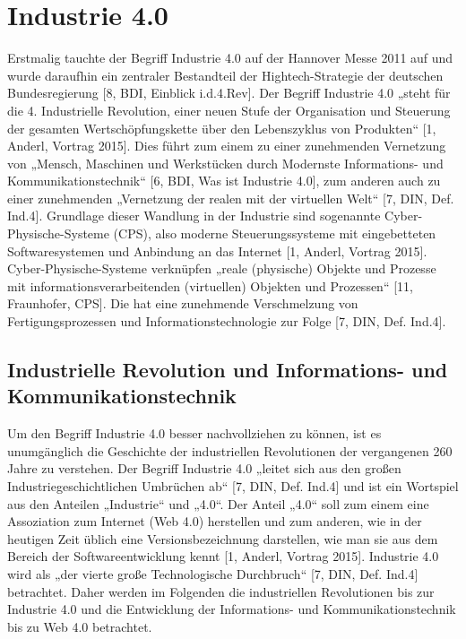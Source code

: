 \section{Industrie 4.0}\label{sec:Industrie4.0}
Erstmalig tauchte der Begriff Industrie 4.0 auf der Hannover Messe 2011 auf und wurde daraufhin ein zentraler Bestandteil der Hightech-Strategie der deutschen Bundesregierung [8, BDI, Einblick i.d.4.Rev].
\newline
Der Begriff Industrie 4.0 „steht für die 4. Industrielle Revolution, einer neuen Stufe der Organisation und Steuerung der gesamten Wertschöpfungskette über den Lebenszyklus von Produkten“ [1, Anderl, Vortrag 2015]. Dies führt zum einem zu einer zunehmenden Vernetzung von „Mensch, Maschinen und Werkstücken durch Modernste Informations- und Kommunikationstechnik“ [6, BDI, Was ist Industrie 4.0], zum anderen auch zu einer zunehmenden „Vernetzung der realen mit der virtuellen Welt“ [7, DIN, Def. Ind.4]. Grundlage dieser Wandlung in der Industrie sind sogenannte Cyber-Physische-Systeme (CPS), also moderne Steuerungssysteme mit eingebetteten Softwaresystemen und Anbindung an das Internet [1, Anderl, Vortrag 2015]. Cyber-Physische-Systeme verknüpfen „reale (physische) Objekte und Prozesse mit informationsverarbeitenden (virtuellen) Objekten und Prozessen“ [11, Fraunhofer, CPS]. Die hat eine zunehmende Verschmelzung von Fertigungsprozessen und Informationstechnologie zur Folge [7, DIN, Def. Ind.4].

\subsection{Industrielle Revolution und Informations- und Kommunikationstechnik}\label{sec:GeschichteIndustrie4}

Um den Begriff Industrie 4.0 besser nachvollziehen zu können, ist es unumgänglich die Geschichte der industriellen Revolutionen der vergangenen 260 Jahre zu verstehen. Der Begriff Industrie 4.0 „leitet sich aus den großen Industriegeschichtlichen Umbrüchen ab“ [7, DIN, Def. Ind.4] und ist ein Wortspiel aus den Anteilen „Industrie“ und „4.0“. Der Anteil „4.0“ soll zum einem eine Assoziation zum Internet (Web 4.0) herstellen und zum anderen, wie in der heutigen Zeit üblich eine Versionsbezeichnung darstellen, wie man sie aus dem Bereich der Softwareentwicklung kennt [1, Anderl, Vortrag 2015].
\newline
Industrie 4.0 wird als „der vierte große Technologische Durchbruch“ [7, DIN, Def. Ind.4] betrachtet. Daher werden im Folgenden die industriellen Revolutionen bis zur Industrie 4.0 und die Entwicklung der Informations- und Kommunikationstechnik bis zu Web 4.0 betrachtet.

